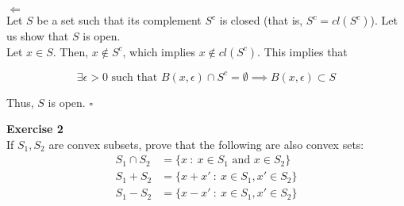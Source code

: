 \documentclass[11pt,table]{article}
\newcommand{\qed}{\hfill $\square$}
\newenvironment{problem}[2][Exercise]
{ \begin{mdframed}[backgroundcolor=gray!20] \textbf{#1 #2} \\}
	{  \end{mdframed}}
\begin{document}
	\(\boxed{\Leftarrow}\)\\
	
	Let \(S\) be a set such that its complement $S^c$ is closed (that is, \(S^c = cl(S^c)\)). Let us show that \(S\) is open. \\
	
	Let \(x \in S\). Then, \(x \notin S^c\), which implies \(x \notin cl(S^c)\). This implies that
	
	\[
	\exists \epsilon > 0 \text{ such that } B(x,\epsilon) \cap S^c = \emptyset \implies B(x,\epsilon) \subset S
	\]
	
	Thus, $S$ is open. \qed \\
	
	\begin{problem}{2}
		If \( S_1, S_2 \) are convex subsets, prove that the following are also convex sets:
		\begin{align*}
			S_{1} \cap S_{2} & = \{x \ : \ x \in S_{1} \text{ and } x \in S_{2}\} \\
			S_{1} + S_{2}    & = \{x + x' \ : \ x \in S_{1}, x' \in S_{2}\}       \\
			S_{1} - S_{2}    & = \{x - x' \ : \ x \in S_{1}, x' \in S_{2}\}
		\end{align*}
		
	\end{problem}
	
\end{document}
